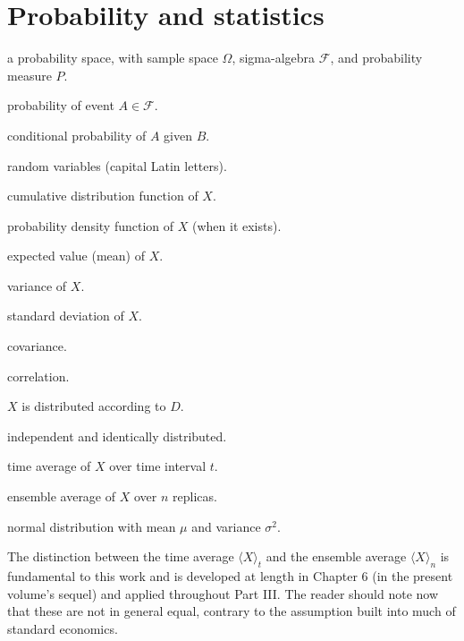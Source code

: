 \section*{Probability and statistics}

\begin{notationbox}
\begin{description}[leftmargin=3cm,style=nextline]
    \item[{$(\Omega, \mathcal{F}, P)$}] a probability space, with sample
        space $\Omega$, sigma-algebra $\mathcal{F}$, and probability
        measure $P$.
    \item[{$P(A)$}] probability of event $A \in \mathcal{F}$.
    \item[{$P(A \mid B)$}] conditional probability of $A$ given $B$.
    \item[{$X, Y, Z$}] random variables (capital Latin letters).
    \item[{$F_X(x) = P(X \leq x)$}] cumulative distribution function of $X$.
    \item[{$f_X(x)$}] probability density function of $X$ (when it exists).
    \item[{$\mathbb{E}[X]$}] expected value (mean) of $X$.
    \item[{$\text{Var}(X)$}] variance of $X$.
    \item[{$\sigma_X$ or $\text{SD}(X)$}] standard deviation of $X$.
    \item[{$\text{Cov}(X, Y)$}] covariance.
    \item[{$\text{Corr}(X, Y)$}] correlation.
    \item[{$X \sim D$}] $X$ is distributed according to $D$.
    \item[{$X_1, X_2, \dots \overset{\text{i.i.d.}}{\sim} D$}]
        independent and identically distributed.
    \item[{$\langle X \rangle_t$}] time average of $X$ over time interval $t$.
    \item[{$\langle X \rangle_n$}] ensemble average of $X$ over $n$ replicas.
    \item[{$N(\mu, \sigma^2)$}] normal distribution with mean $\mu$ and
        variance $\sigma^2$.
\end{description}
\end{notationbox}

The distinction between the time average $\langle X \rangle_t$ and
the ensemble average $\langle X \rangle_n$ is fundamental to this work
and is developed at length in Chapter 6 (in the present volume's
sequel) and applied throughout Part III. The reader should note now
that these are not in general equal, contrary to the assumption built
into much of standard economics.

